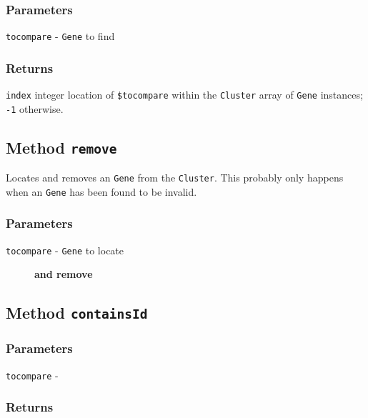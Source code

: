 \subsubsection*{Parameters\label{Parameters}}
\begin{description}

\item[{\texttt{tocompare} - \texttt{Gene} to find}] \mbox{}\end{description}
\subsubsection*{Returns\label{Returns}}


\texttt{index} integer location of \texttt{\$tocompare} within the \texttt{Cluster} array of \texttt{Gene} instances; \texttt{-1} otherwise.

\subsection*{Method \texttt{remove}\label{Method_remove}}


Locates and removes an \texttt{Gene} from the \texttt{Cluster}. This probably only happens
when an \texttt{Gene} has been found to be invalid.

\subsubsection*{Parameters\label{Parameters}}
\begin{description}

\item[{\texttt{tocompare} - \texttt{Gene} to locate}] \textbf{and remove}\end{description}
\subsection*{Method \texttt{containsId}\label{Method_containsId}}
\subsubsection*{Parameters\label{Parameters}}
\begin{description}

\item[{\texttt{tocompare} -}] \mbox{}\end{description}
\subsubsection*{Returns\label{Returns}}


